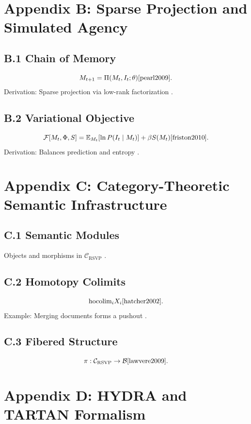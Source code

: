 \documentclass[12pt]{article}
\begin{document}
{{\section*{Appendix B: Sparse Projection and Simulated Agency}

\subsection*{B.1 Chain of Memory}

\[
M_{t+1} = \Pi(M_t, I_t; \theta) \cite{pearl2009}.
\]
Derivation: Sparse projection via low-rank factorization \citep{hohwy2013}.

\subsection*{B.2 Variational Objective}

\[
\mathcal{F}[M_t, \Phi, S] = \mathbb{E}_{M_t}[\ln P(I_t \mid M_t)] + \beta S(M_t) \cite{friston2010}.
\]
Derivation: Balances prediction and entropy \citep{tononi2004}.

\section*{Appendix C: Category-Theoretic Semantic Infrastructure}

\subsection*{C.1 Semantic Modules}

Objects and morphisms in \(\mathcal{C}_{\text{RSVP}}\) \cite{maclane1998}.

\subsection*{C.2 Homotopy Colimits}

\[
\text{hocolim}_i X_i \cite{hatcher2002}.
\]
Example: Merging documents forms a pushout \citep{may1999}.

\subsection*{C.3 Fibered Structure}

\[
\pi: \mathcal{C}_{\text{RSVP}} \to \mathcal{B} \cite{lawvere2009}.
\]

\section*{Appendix D: HYDRA and TARTAN Formalism}

}}
\end{document}
